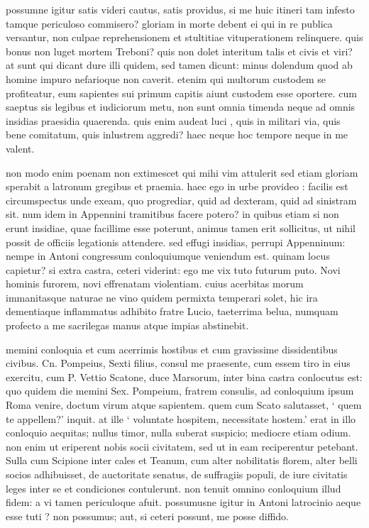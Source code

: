  possumne igitur satis videri cautus, satis providus, si me huic itineri tam infesto tamque periculoso commisero? gloriam in morte debent ei qui in re publica versantur, non culpae reprehensionem et stultitiae vituperationem relinquere. quis bonus non luget mortem Treboni? quis non dolet interitum talis et civis et viri? at sunt qui dicant dure illi quidem, sed tamen dicunt: minus dolendum quod ab homine impuro nefarioque non caverit. etenim qui multorum custodem se profiteatur, eum sapientes sui primum capitis aiunt custodem esse oportere. cum saeptus sis legibus et iudiciorum metu, non sunt omnia timenda neque ad omnis insidias praesidia quaerenda. quis enim audeat luci , quis in militari via, quis bene comitatum, quis inlustrem aggredi? haec neque hoc tempore neque in me valent.

 non modo enim poenam non extimescet qui mihi vim attulerit sed etiam gloriam sperabit a latronum gregibus et praemia. haec ego in urbe provideo : facilis est circumspectus unde exeam, quo progrediar, quid ad dexteram, quid ad sinistram sit. num idem in Appennini tramitibus facere potero? in quibus etiam si non erunt insidiae, quae facillime esse poterunt, animus tamen erit sollicitus, ut nihil possit de officiis legationis attendere. sed effugi insidias, perrupi Appenninum: nempe in Antoni congressum conloquiumque veniendum est. quinam locus capietur? si extra castra, ceteri viderint: ego me vix tuto futurum puto. Novi hominis furorem, novi effrenatam violentiam. cuius acerbitas morum immanitasque naturae ne vino quidem permixta temperari solet, hic ira dementiaque inflammatus adhibito fratre Lucio, taeterrima belua, numquam profecto a me sacrilegas manus atque impias abstinebit.

 memini conloquia et cum acerrimis hostibus et cum gravissime dissidentibus civibus. Cn. Pompeius, Sexti filius, consul me praesente, cum essem tiro in eius exercitu, cum P. Vettio Scatone, duce Marsorum, inter bina castra conlocutus est: quo quidem die memini Sex. Pompeium, fratrem consulis, ad conloquium ipsum Roma venire, doctum virum atque sapientem. quem cum Scato salutasset, ` quem te appellem?' inquit. at ille ` voluntate hospitem, necessitate hostem.' erat in illo conloquio aequitas; nullus timor, nulla suberat suspicio; mediocre etiam odium. non enim ut eriperent nobis socii civitatem, sed ut in eam reciperentur petebant. Sulla cum Scipione inter cales et Teanum, cum alter nobilitatis florem, alter belli socios adhibuisset, de auctoritate senatus, de suffragiis populi, de iure civitatis leges inter se et condiciones contulerunt. non tenuit omnino conloquium illud fidem: a vi tamen periculoque afuit. possumusne igitur in Antoni latrocinio aeque esse tuti ? non possumus; aut, si ceteri possunt, me posse diffido.


